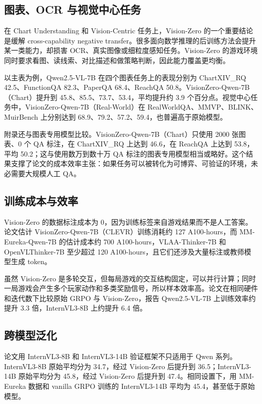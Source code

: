 \subsection{图表、OCR 与视觉中心任务}

在 Chart Understanding 和 Vision-Centric 任务上，Vision-Zero 的一个重要结论是缓解 cross-capability negative transfer。很多面向数学推理的后训练方法会提升某一类能力，却损害 OCR、真实图像或细粒度感知任务。Vision-Zero 的游戏环境同时要求看图、读线索、对比描述和做策略判断，因此能力覆盖更均衡。

以主表为例，Qwen2.5-VL-7B 在四个图表任务上的表现分别为 ChartXIV\_RQ 42.5、FunctionQA 82.3、PaperQA 68.4、ReachQA 50.8。VisionZero-Qwen-7B（Chart）提升到 45.8、85.5、73.7、53.4，平均提升约 3.9 个百分点。视觉中心任务中，VisionZero-Qwen-7B（Real-World）在 RealWorldQA、MMVP、BLINK、MuirBench 上分别达到 68.9、79.2、57.2、59.4，也普遍高于原始模型。

附录还与图表专用模型比较。VisionZero-Qwen-7B（Chart）只使用 2000 张图表、0 个 QA 标注，在 ChartXIV\_RQ 上达到 46.6，在 ReachQA 上达到 53.8，平均 50.2；这与使用数万到数十万 QA 标注的图表专用模型相当或略好。这个结果支撑了论文的成本效率主张：如果任务可以被转化为可博弈、可验证的环境，未必需要大规模人工 QA。

\subsection{训练成本与效率}

Vision-Zero 的数据标注成本为 0，因为训练标签来自游戏结果而不是人工答案。论文估计 VisionZero-Qwen-7B（CLEVR）训练消耗约 127 A100-hours，而 MM-Eureka-Qwen-7B 的估计成本约 700 A100-hours，VLAA-Thinker-7B 和 OpenVLThinker-7B 至少超过 120 A100-hours，且它们还涉及大量标注或教师模型生成 token。

虽然 Vision-Zero 是多轮交互，但每局游戏的交互结构固定，可以并行计算；同时一局游戏会产生多个玩家动作和多类奖励信号，所以样本效率高。论文在相同硬件和迭代数下比较原始 GRPO 与 Vision-Zero，报告 Qwen2.5-VL-7B 上训练效率约提升 3.3 倍，InternVL3-8B 上约提升 6.4 倍。

\subsection{跨模型泛化}

论文用 InternVL3-8B 和 InternVL3-14B 验证框架不只适用于 Qwen 系列。InternVL3-8B 原始平均分为 34.7，经过 Vision-Zero 后提升到 36.5；InternVL3-14B 原始平均分为 45.8，经过 Vision-Zero 后提升到 47.4。相同设置下，用 MM-Eureka 数据和 vanilla GRPO 训练的 InternVL3-14B 平均为 45.4，甚至低于原始模型。


